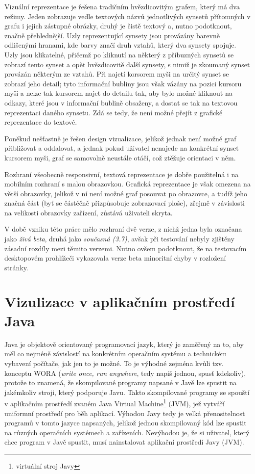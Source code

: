 \documentclass[a4paper, 11pt, oneside]{book}
\begin{document}
				Vizuální reprezentace je řešena tradičním hvězdicovitým grafem, který má dva režimy. Jeden zobrazuje vedle textových názvů jednotlivých synsetů přítomných v grafu i jejich zástupné obrázky, druhý je čistě textový a, nutno podotknout, značně přehlednější. Uzly reprezentující synsety jsou provázány barevně odlišenými hranami, kde barvy značí druh vztahů, který dva synsety spojuje. Uzly jsou klikatelné, přičemž po kliknutí na některý z příbuzných synsetů se zobrazí tento synset a opět hvězdicovitě další synsety, s nimiž je zkoumaný synset provázán některým ze vztahů. Při najetí korsorem myši na určitý synset se zobrazí jeho detail; tyto informační bubliny jsou však vázány na pozici kursoru myši a nelze tak kursorem najet do detailu tak, aby bylo možné kliknout na odkazy, které jsou v informační bublině obsaženy, a dostat se tak na textovou reprezentaci daného synsetu. Zdá se tedy, že není možné přejít z grafické reprezentace do textové.

				Poněkud nešťastně je řešen design vizualizace, jelikož jednak není možné graf přibližovat a oddalovat, a jednak pokud uživatel nenajede na konkrétní synset kursorem myši, graf se samovolně neustále otáčí, což ztěžuje orientaci v něm.

				Rozhraní všeobecně responsivní, textová reprezentace je dobře použitelná i na mobilním rozhraní s malou obrazovkou. Grafická reprezentace je však omezena na větší obrazovky, jelikož v ní není možné graf posouvat po obrazovce, a tudíž jeho značná část (byť se částěčně přizpůsobuje zobrazovací ploše), zřejmě v závislosti na velikosti obrazovky zařízení, zůstává uživateli skryta.

				V době vzniku této práce mělo rozhraní dvě verze, z nichž jedna byla označana jako \textit{živá beta}, druhá jako \textit{současná (3.7)}, avšak při testování nebyly zjištěny zásadní rozdíly mezi těmito verzemi. Nutno ovšem podotknout, že na testovacím desktopovém prohlížeči vykazovala verze beta minoritní chyby v rozložení stránky.

		\chapter{Vizulizace v aplikačním prostředí Java}

			Java je objektově orientovaný programovací jazyk, který je zaměřený na to, aby měl co nejméně závislostí na konkrétním operačním systému a technickém vybavení počítače, jak jen to je možné. To je výhodné zejména kvůli tzv. konceptu WORA (\textit{write once, run anywhere}, tedy napiš jednou, spusť kdekoliv), protože to znamená, že skompilované programy napsané v Javě lze spustit na jakémkoliv stroji, který podporuje Javu. Takto skompilované programy se spouští v aplikačním prostředí zvaném Java Virtual Machine\footnote{virtuální stroj Javy} (JVM), jež vytváří uniformní prostředí pro běh aplikací. Výhodou Javy tedy je velká přenositelnost programů v tomto jazyce napsaných, jelikož jednou skompilovaný kód lze spustit na různých operačních systémech a zařízeních. Nevýhodou je, že si uživatel, který chce program v Javě spustit, musí nainstalovat aplikační prostředí Javy (JVM). 
\end{document}
